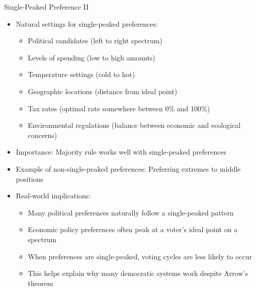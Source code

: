 \documentclass[10pt]{beamer}
\begin{document}
\begin{frame}{Single-Peaked Preference II}
  \begin{itemize}[<+->]
    \item Natural settings for single-peaked preferences:
      \begin{itemize}
        \item Political candidates (left to right spectrum)
        \item Levels of spending (low to high amounts)
        \item Temperature settings (cold to hot)
        \item Geographic locations (distance from ideal point)
        \item Tax rates (optimal rate somewhere between 0\% and 100\%)
        \item Environmental regulations (balance between economic and ecological concerns)
      \end{itemize}
    \item Importance: Majority rule works well with single-peaked preferences
    \item Example of non-single-peaked preferences: Preferring extremes to middle positions
    \item Real-world implications:
      \begin{itemize}
        \item Many political preferences naturally follow a single-peaked pattern
        \item Economic policy preferences often peak at a voter's ideal point on a spectrum
        \item When preferences are single-peaked, voting cycles are less likely to occur
        \item This helps explain why many democratic systems work despite Arrow's theorem
      \end{itemize}
  \end{itemize}
\end{frame}
\end{document}
